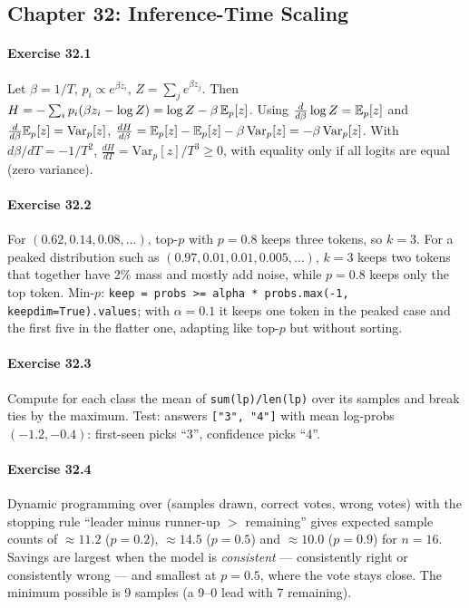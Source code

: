 \subsection*{Chapter 32: Inference-Time Scaling}

\paragraph{Exercise 32.1} Let $\beta = 1/T$, $p_i \propto e^{\beta z_i}$, $Z = \sum_j e^{\beta z_j}$.
Then $H = -\sum_i p_i(\beta z_i - \log Z) = \log Z - \beta\,\mathbb{E}_p[z]$. Using
$\frac{d}{d\beta}\log Z = \mathbb{E}_p[z]$ and $\frac{d}{d\beta}\mathbb{E}_p[z] = \mathrm{Var}_p[z]$,
$\frac{dH}{d\beta} = \mathbb{E}_p[z] - \mathbb{E}_p[z] - \beta\,\mathrm{Var}_p[z] = -\beta\,\mathrm{Var}_p[z]$.
With $d\beta/dT = -1/T^2$, $\frac{dH}{dT} = \mathrm{Var}_p[z]/T^3 \ge 0$, with equality only if all
logits are equal (zero variance).

\paragraph{Exercise 32.2} For $(0.62, 0.14, 0.08, \dots)$, top-$p$ with $p = 0.8$ keeps three tokens,
so $k = 3$. For a peaked distribution such as $(0.97, 0.01, 0.01, 0.005, \dots)$, $k = 3$ keeps two
tokens that together have 2\% mass and mostly add noise, while $p = 0.8$ keeps only the top token.
Min-$p$: \texttt{keep = probs >= alpha * probs.max(-1, keepdim=True).values}; with $\alpha = 0.1$ it
keeps one token in the peaked case and the first five in the flatter one, adapting like top-$p$ but
without sorting.

\paragraph{Exercise 32.3} Compute for each class the mean of \texttt{sum(lp)/len(lp)} over its
samples and break ties by the maximum. Test: answers \texttt{["3", "4"]} with mean log-probs
$(-1.2, -0.4)$: first-seen picks ``3'', confidence picks ``4''.

\paragraph{Exercise 32.4} Dynamic programming over (samples drawn, correct votes, wrong votes) with
the stopping rule ``leader minus runner-up $>$ remaining'' gives expected sample counts of
$\approx 11.2$ ($p = 0.2$), $\approx 14.5$ ($p = 0.5$) and $\approx 10.0$ ($p = 0.9$) for $n = 16$.
Savings are largest when the model is \emph{consistent} --- consistently right or consistently wrong
--- and smallest at $p = 0.5$, where the vote stays close. The minimum possible is 9 samples (a 9--0
lead with 7 remaining).

